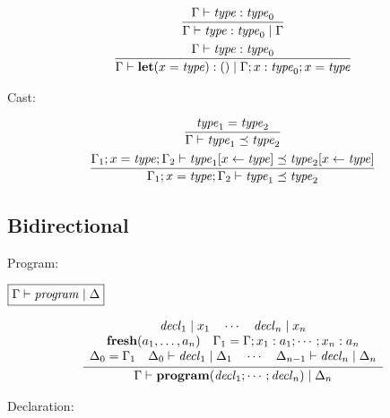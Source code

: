 \begin{gather*}
  \infer{\Gamma \vdash \mathit{type}: \mathit{type}_0 \mid \Gamma}{
    \Gamma \vdash \mathit{type}: \mathit{type}_0
  }
  \\
  \infer{\Gamma \vdash \mathbf{let}(x = \mathit{type}): () \mid \Gamma; x: \mathit{type}_0; x = \mathit{type}}{
    \Gamma \vdash \mathit{type}: \mathit{type}_0
  }
\end{gather*}

Cast:

\begin{gather*}
  \infer{\Gamma \vdash \mathit{type}_1 \preceq \mathit{type}_2}{
    \mathit{type}_1 = \mathit{type}_2
  }
  \\
  \infer{\Gamma_1; x = \mathit{type}; \Gamma_2 \vdash \mathit{type}_1 \preceq \mathit{type}_2}{
    \Gamma_1; x = \mathit{type}; \Gamma_2 \vdash \mathit{type}_1[x \assign \mathit{type}] \preceq \mathit{type}_2[x \assign \mathit{type}]
  }
\end{gather*}

\subsection{Bidirectional}

Program:

$\fbox{$\Gamma \vdash \mathit{program} \mid \Delta$}$

\begin{gather*}
  \infer{\Gamma \vdash \mathbf{program}(\mathit{decl}_1; \cdots; \mathit{decl}_n) \mid \Delta_n}{
    \begin{array}{c}
      \mathit{decl}_1 \mid x_1
      \hspace{1em}
      \cdots
      \hspace{1em}
      \mathit{decl}_n \mid x_n
      \\
      \mathbf{fresh}(a_1, \ldots, a_n)
      \hspace{1em}
      \Gamma_1 = \Gamma; x_1: a_1; \cdots; x_n: a_n
      \\
      \Delta_0 = \Gamma_1
      \hspace{1em}
      \Delta_0 \vdash \mathit{decl}_1 \mid \Delta_1
      \hspace{1em}
      \cdots
      \hspace{1em}
      \Delta_{n - 1} \vdash \mathit{decl}_n \mid \Delta_n
    \end{array}
  }
\end{gather*}

Declaration:


